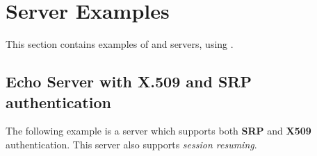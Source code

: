 \documentclass{book}
\begin{document}


\section{Server Examples}
This section contains examples of \tls and \ssl servers, using \gnutls.

\subsection{Echo Server with X.509 and SRP authentication}
The following example is a server which supports both {\bf SRP} and {\bf X509} authentication.
This server also supports {\it session resuming}.







\end{document}
